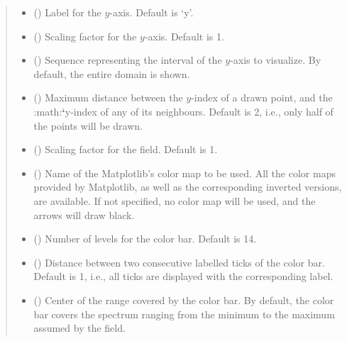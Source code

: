 \documentclass[letterpaper,10pt,english]{sphinxmanual}
\begin{document}
\begin{fulllineitems}
\begin{quote}
\begin{description}
\begin{itemize}
\item {} 
 () \textendash{} Label for the \(y\)-axis. Default is ‘y’.

\item {} 
 () \textendash{} Scaling factor for the \(y\)-axis. Default is 1.

\item {} 
 () \textendash{} Sequence representing the interval of the \(y\)-axis to visualize.
By default, the entire domain is shown.

\item {} 
 () \textendash{} Maximum distance between the \(y\)-index of a drawn point, and the :math:{\color{red}\bfseries{}{}`}y-index of any
of its neighbours. Default is 2, i.e., only half of the points will be drawn.

\item {} 
 () \textendash{} Scaling factor for the field. Default is 1.

\item {} 
 () \textendash{} Name of the Matplotlib’s color map to be used. All the color maps provided by Matplotlib,
as well as the corresponding inverted versions, are available. If not specified, no color map
will be used, and the arrows will draw black.

\item {} 
 () \textendash{} Number of levels for the color bar. Default is 14.

\item {} 
 () \textendash{} Distance between two consecutive labelled ticks of the color bar. Default is 1, i.e.,
all ticks are displayed with the corresponding label.

\item {} 
 () \textendash{} Center of the range covered by the color bar. By default, the color bar covers the spectrum
ranging from the minimum to the maximum assumed by the field.


\end{itemize}
\end{description}
\end{quote}
\end{fulllineitems}
\end{document}
